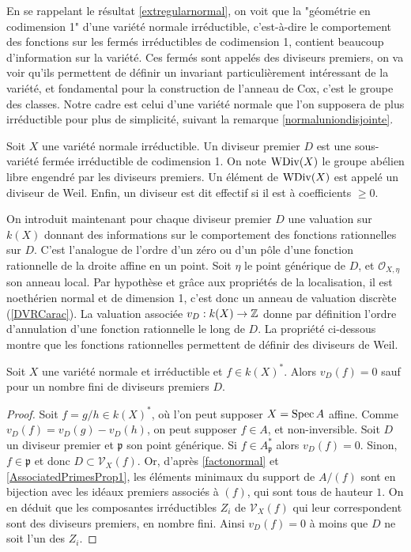 En se rappelant le résultat \ref{extregularnormal}, on voit que la "géométrie en codimension 1" d'une variété normale irréductible, c'est-à-dire le comportement des fonctions sur les fermés irréductibles de codimension 1, contient beaucoup d'information sur la variété. Ces fermés sont appelés des diviseurs premiers, on va voir qu'ils permettent de définir un invariant particulièrement intéressant de la variété, et fondamental pour la construction de l'anneau de Cox, c'est le groupe des classes. Notre cadre est celui d'une variété normale que l'on supposera de plus irréductible pour plus de simplicité, suivant la remarque \ref{normaluniondisjointe}.

\begin{defn}
Soit $X$ une variété normale irréductible. Un diviseur premier $D$ est une sous-variété fermée irréductible de codimension 1. On note $\operatorname{WDiv}(X)$ le groupe abélien libre engendré par les diviseurs premiers. Un élément de $\operatorname{WDiv}(X)$ est appelé un diviseur de Weil. Enfin, un diviseur est dit effectif si il est à coefficients $\geq 0$. 
\end{defn}
On introduit maintenant pour chaque diviseur premier $D$ une valuation sur $k(X)$ donnant des informations sur le comportement des fonctions rationnelles sur $D$. C'est l'analogue de l'ordre d'un zéro ou d'un pôle d'une fonction rationnelle de la droite affine en un point. Soit $\eta$ le point générique de $D$, et $\mathcal{O}_{X,\eta}$ son anneau local. Par hypothèse et grâce aux propriétés de la localisation, il est noethérien normal et de dimension 1, c'est donc un anneau de valuation discrète (\ref{DVRCarac}). La valuation associée $v_D:k(X)\rightarrow \mathbb{Z}$ donne par définition l'ordre d'annulation d'une fonction rationnelle le long de $D$. La propriété ci-dessous montre que les fonctions rationnelles permettent de définir des diviseurs de Weil.

\begin{prop}\label{noethérienPWDivBienDef}
Soit $X$ une variété normale et irréductible et $f\in k(X)^*$. Alors $v_D(f)=0$ sauf pour un nombre fini de diviseurs premiers $D$.
\end{prop}
\begin{proof}
Soit $f=g/h\in k(X)^*$, où l'on peut supposer $X=\operatorname{Spec} A$ affine. Comme $v_D(f)=v_D(g)-v_D(h)$, on peut supposer $f\in A$, et non-inversible. Soit $D$ un diviseur premier et $\mathfrak{p}$ son point générique. Si $f\in A_\mathfrak{p}^*$ alors $v_D(f)=0$. Sinon, $f\in \mathfrak{p}$ et donc $D \subset \mathcal{V}_X(f)$. Or, d'après \ref{factonormal} et \ref{AssociatedPrimesProp1}, les éléments minimaux du support de $A/(f)$ sont en bijection avec les idéaux premiers associés à $(f)$, qui sont tous de hauteur $1$. On en déduit que les composantes irréductibles $Z_i$ de $\mathcal{V}_X(f)$ qui leur correspondent sont des diviseurs premiers, en nombre fini. Ainsi $v_D(f)=0$ à moins que $D$ ne soit l'un des $Z_i$.
\end{proof}


